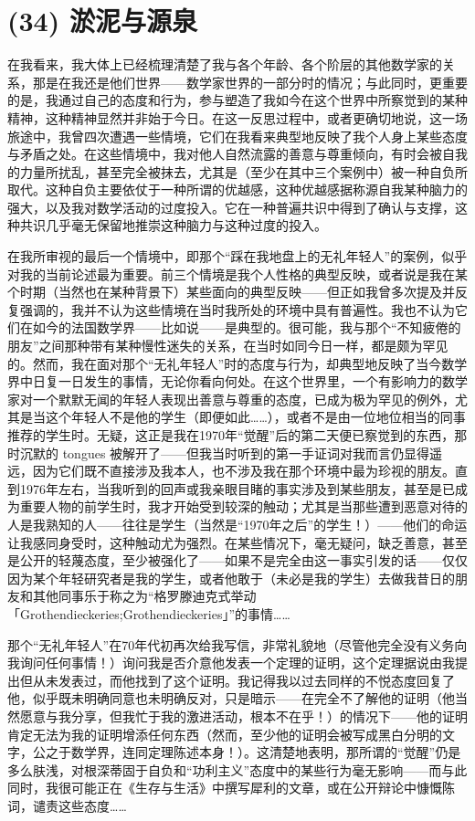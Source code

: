 \section{(34) 淤泥与源泉}

在我看来，我大体上已经梳理清楚了我与各个年龄、各个阶层的其他数学家的关系，那是在我还是他们世界——数学家世界的一部分时的情况；与此同时，更重要的是，我通过自己的态度和行为，参与塑造了我如今在这个世界中所察觉到的某种精神，这种精神显然并非始于今日。在这一反思过程中，或者更确切地说，这一场旅途中，我曾四次遭遇一些情境，它们在我看来典型地反映了我个人身上某些态度与矛盾之处。在这些情境中，我对他人自然流露的善意与尊重倾向，有时会被自我的力量所扰乱，甚至完全被抹去，尤其是（至少在其中三个案例中）被一种自负所取代。这种自负主要依仗于一种所谓的优越感，这种优越感据称源自我某种脑力的强大，以及我对数学活动的过度投入。它在一种普遍共识中得到了确认与支撑，这种共识几乎毫无保留地推崇这种脑力与这种过度的投入。

在我所审视的最后一个情境中，即那个“踩在我地盘上的无礼年轻人”的案例，似乎对我的当前论述最为重要。前三个情境是我个人性格的典型反映，或者说是我在某个时期（当然也在某种背景下）某些面向的典型反映——但正如我曾多次提及并反复强调的，我并不认为这些情境在当时我所处的环境中具有普遍性。我也不认为它们在如今的法国数学界——比如说——是典型的。很可能，我与那个“不知疲倦的朋友”之间那种带有某种慢性迷失的关系，在当时如同今日一样，都是颇为罕见的。然而，我在面对那个“无礼年轻人”时的态度与行为，却典型地反映了当今数学界中日复一日发生的事情，无论你看向何处。在这个世界里，一个有影响力的数学家对一个默默无闻的年轻人表现出善意与尊重的态度，已成为极为罕见的例外，尤其是当这个年轻人不是他的学生（即便如此……），或者不是由一位地位相当的同事推荐的学生时。无疑，这正是我在1970年“觉醒”后的第二天便已察觉到的东西，那时沉默的 tongues 被解开了——但我当时听到的第一手证词对我而言仍显得遥远，因为它们既不直接涉及我本人，也不涉及我在那个环境中最为珍视的朋友。直到1976年左右，当我听到的回声或我亲眼目睹的事实涉及到某些朋友，甚至是已成为重要人物的前学生时，我才开始受到较深的触动；尤其是当那些遭到恶意对待的人是我熟知的人——往往是学生（当然是“1970年之后”的学生！）——他们的命运让我感同身受时，这种触动尤为强烈。在某些情况下，毫无疑问，缺乏善意，甚至是公开的轻蔑态度，至少被强化了——如果不是完全由这一事实引发的话——仅仅因为某个年轻研究者是我的学生，或者他敢于（未必是我的学生）去做我昔日的朋友和其他同事乐于称之为“格罗滕迪克式举动「Grothendieckeries;Grothendieckeries」”的事情……

那个“无礼年轻人”在70年代初再次给我写信，非常礼貌地（尽管他完全没有义务向我询问任何事情！）询问我是否介意他发表一个定理的证明，这个定理据说由我提出但从未发表过，而他找到了这个证明。我记得我以过去同样的不悦态度回复了他，似乎既未明确同意也未明确反对，只是暗示——在完全不了解他的证明（他当然愿意与我分享，但我忙于我的激进活动，根本不在乎！）的情况下——他的证明肯定无法为我的证明增添任何东西（然而，至少他的证明会被写成黑白分明的文字，公之于数学界，连同定理陈述本身！）。这清楚地表明，那所谓的“觉醒”仍是多么肤浅，对根深蒂固于自负和“功利主义”态度中的某些行为毫无影响——而与此同时，我很可能正在《生存与生活》中撰写犀利的文章，或在公开辩论中慷慨陈词，谴责这些态度……

